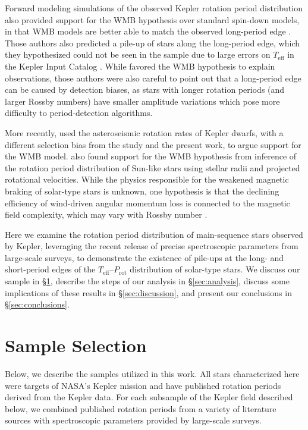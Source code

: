 \documentclass[linenumbers,tighten,trackchanges,twocolumn]{aastex631}
\newcommand{\teff}{\ensuremath{T_{\mathrm{eff}}}\xspace}
\newcommand{\prot}{\ensuremath{P_\mathrm{rot}}\xspace}
\begin{document}
Forward modeling simulations of the observed Kepler rotation period distribution also provided support for the WMB hypothesis over standard spin-down models, in that WMB models are better able to match the observed long-period edge \citep{vanSaders2019}. Those authors also predicted a pile-up of stars along the long-period edge, which they hypothesized could not be seen in the \citet{McQuillan2014} sample due to large errors on \teff in the Kepler Input Catalog \citep[KIC,][]{Brown2011}. While \citet{vanSaders2019} favored the WMB hypothesis to explain observations, those authors were also careful to point out that a long-period edge can be caused by detection biases, as stars with longer rotation periods (and larger Rossby numbers) have smaller amplitude variations which pose more difficulty to period-detection algorithms. 

More recently, \citet{Hall2021} used the asteroseismic rotation rates of Kepler dwarfs, with a different selection bias from the \citet{vanSaders2019} study and the present work, to argue support for the WMB model. \citet{Masuda2021} also found support for the WMB hypothesis from inference of the rotation period distribution of Sun-like stars using stellar radii and projected rotational velocities.  While the physics responsible for the weakened magnetic braking of solar-type stars is unknown, one hypothesis is that the declining efficiency of wind-driven angular momentum loss is connected to the magnetic field complexity, which may vary with Rossby number \citep[e.g.][]{Reville2015, vanSaders2016, Garraffo2016, Metcalfe2016, Metcalfe2019}.  

Here we examine the rotation period distribution of main-sequence stars observed by Kepler, leveraging the recent release of precise spectroscopic parameters from large-scale surveys, to demonstrate the existence of pile-ups at the long- and short-period edges of the \teff--\prot distribution of solar-type stars. We discuss our sample in \S\ref{sec:sample}, describe the steps of our analysis in \S\ref{sec:analysis}, discuss some implications of these results in \S\ref{sec:discussion}, and present our conclusions in \S\ref{sec:conclusions}.

\section{Sample Selection} \label{sec:sample}
Below, we describe the samples utilized in this work. All stars characterized here were targets of NASA's Kepler mission \citep{Borucki2010} and have published rotation periods derived from the Kepler data. For each subsample of the Kepler field described below, we combined published rotation periods from a variety of literature sources with spectroscopic parameters provided by large-scale surveys.
\end{document}
